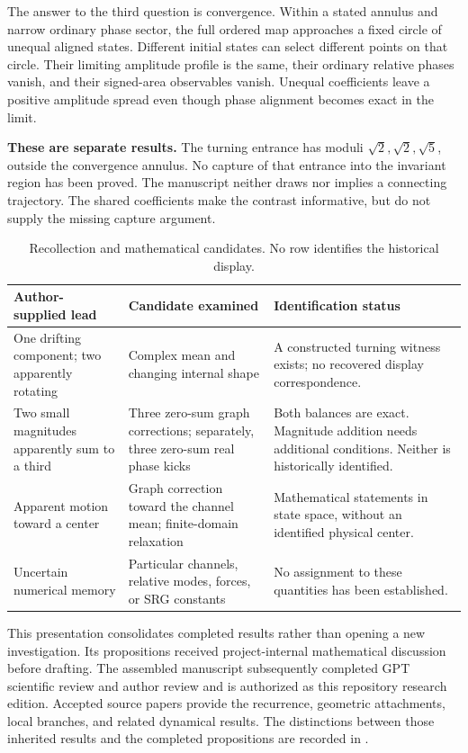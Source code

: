 \documentclass[11pt,a4paper]{article}
\numberwithin{equation}{section}
\theoremstyle{remark}\newtheorem{remark}[theorem]{Remark}
\begin{document}
The answer to the third question is convergence. Within a stated annulus and narrow ordinary phase sector, the full ordered map approaches a fixed circle of unequal aligned states. Different initial states can select different points on that circle. Their limiting amplitude profile is the same, their ordinary relative phases vanish, and their signed-area observables vanish. Unequal coefficients leave a positive amplitude spread even though phase alignment becomes exact in the limit.

\textbf{These are separate results.} The turning entrance has moduli $\sqrt2,\sqrt2,\sqrt5$, outside the convergence annulus. No capture of that entrance into the invariant region has been proved. The manuscript neither draws nor implies a connecting trajectory. The shared coefficients make the contrast informative, but do not supply the missing capture argument.

\begin{table}[htbp]\centering\small
\caption{Recollection and mathematical candidates. No row identifies the historical display.}
\begin{tabularx}{\textwidth}{@{}L{.26\textwidth}YY@{}}\toprule
Author-supplied lead & Candidate examined & Identification status\\\midrule
One drifting component; two apparently rotating & Complex mean and changing internal shape & A constructed turning witness exists; no recovered display correspondence.\\
Two small magnitudes apparently sum to a third & Three zero-sum graph corrections; separately, three zero-sum real phase kicks & Both balances are exact. Magnitude addition needs additional conditions. Neither is historically identified.\\
Apparent motion toward a center & Graph correction toward the channel mean; finite-domain relaxation & Mathematical statements in state space, without an identified physical center.\\
Uncertain numerical memory & Particular channels, relative modes, forces, or SRG constants & No assignment to these quantities has been established.\\\bottomrule
\end{tabularx}
\end{table}

This presentation consolidates completed results rather than opening a new investigation. Its propositions received project-internal mathematical discussion before drafting. The assembled manuscript subsequently completed GPT scientific review and author review and is authorized as this repository research edition. Accepted source papers provide the recurrence, geometric attachments, local branches, and related dynamical results. The distinctions between those inherited results and the completed propositions are recorded in .
\end{document}

